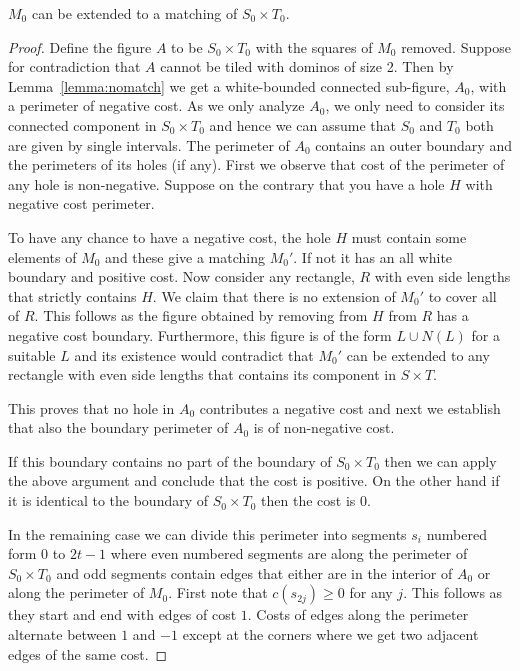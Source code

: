 \documentclass{theoretics}
\begin{document}
\begin{lemma}\label{lemma:s0t0}
$M_0$ can be extended to a matching 
of $S_0 \times T_0$.
\end{lemma}

\begin{proof}
Define the figure $A$ to be $S_0 \times
T_0$ with the squares of $M_0$ removed.  Suppose for
contradiction that $A$ cannot be tiled with dominos of size 2.
Then by Lemma~\ref{lemma:nomatch} we get a white-bounded
connected sub-figure, $A_0$, with a perimeter 
of negative cost.  As we only analyze $A_0$, we only need to
consider its connected component in $S_0 \times T_0$
and hence we can assume
that $S_0$ and $T_0$ both are given by single intervals.
The perimeter of $A_0$ contains an outer boundary and the
perimeters of its holes (if any).  First we observe that cost of
the perimeter of any hole is non-negative.  Suppose on the contrary
that you have a hole $H$ with negative cost perimeter.

To have any chance to have a negative cost, the hole $H$ must
contain some elements of $M_0$ and these give
a matching $M_0'$.  If not it has an all white boundary
and positive cost.  Now consider any rectangle, $R$ with even
side lengths that strictly contains $H$.  We claim
that there is no extension of $M_0'$ to cover all of $R$.
This follows as the figure obtained by removing from
$H$ from $R$ has a negative cost boundary.
Furthermore, this figure is of the form $L \cup N(L)$ for a suitable
$L$ and its existence would contradict that $M_0'$ can be extended
to any rectangle with even side lengths that contains
its component in $S\times T$. 

This proves that no hole in $A_0$ contributes a negative
cost and next we establish that also the boundary
perimeter of $A_0$ is of non-negative cost.

If this boundary contains no part of the boundary of $S_0 \times T_0$
then we can apply the above argument and conclude that
the cost is positive.  On the other hand if it is identical
to the boundary of $S_0 \times T_0$ then the cost is 0.

In the remaining case we can 
divide this perimeter into segments $s_i$ numbered
form $0$ to $2t-1$ where even numbered segments
are along the perimeter of $S_0 \times T_0$ and
odd segments contain edges that either are in
the interior of $A_0$ or along the perimeter of
$M_0$.  First note that $c(s_{2j})\geq 0$ for any
$j$.  This follows as they start and end with
edges of cost $1$.  Costs of edges along the perimeter
alternate between $1$ and $-1$ except at the corners
where we get two adjacent edges of the same cost.


\end{proof}
\end{document}
